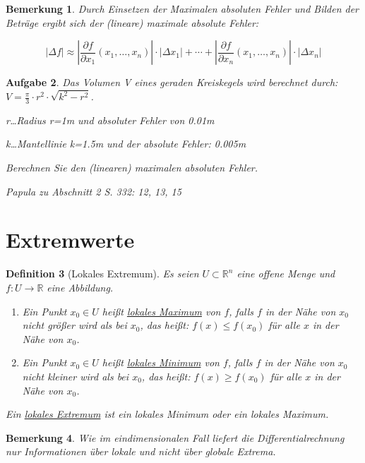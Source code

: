 \documentclass[12pt,a4paper]{scrreprt}
\newtheorem{defi}{Definition}[section]
\newtheorem{bemerkung}[defi]{Bemerkung}
\newtheorem{aufg}[defi]{Aufgabe}
\begin{document}
\begin{bemerkung}
	Durch Einsetzen der Maximalen absoluten Fehler und Bilden der Beträge ergibt sich der (lineare) maximale absolute Fehler:

	\[\left|\Delta f\right|\approx \left|\frac{\partial f}{\partial x_1}(x_1,\dots,x_n)\right|\cdot\left|\Delta x_1\right|+\cdots+\left|\frac{\partial f}{\partial x_n}(x_1,\dots,x_n)\right|\cdot\left|\Delta x_n\right|\]
\end{bemerkung}

\begin{aufg}
	Das Volumen V eines geraden Kreiskegels wird berechnet durch: $V=\frac{\pi}{3}\cdot r^2 \cdot \sqrt{k^2-r^2}$.

	r\dots Radius r=1m und absoluter Fehler von 0.01m

	k\dots Mantellinie k=1.5m und der absolute Fehler: 0.005m

	Berechnen Sie den (linearen) maximalen absoluten Fehler.

	Papula zu Abschnitt 2 S. 332: 12, 13, 15
\end{aufg}

\section{Extremwerte}

\begin{defi}[Lokales Extremum]
	Es seien $U\subset\mathbb{R}^n$ eine offene Menge und $f:U\to\mathbb{R}$ eine Abbildung.
	\begin{enumerate}[label=\emph{(\roman*)}]
		\item Ein Punkt $x_0\in U$ heißt \underline{lokales Maximum} von $f$, falls $f$ in der Nähe von $x_0$ nicht größer wird als bei $x_0$, das heißt:
		$f(x)\le f(x_0)$ für alle $x$ in der Nähe von $x_0$.
		\item Ein Punkt $x_0\in U$ heißt \underline{lokales Minimum} von $f$, falls $f$ in der Nähe von $x_0$ nicht kleiner wird als bei $x_0$, das heißt:
		$f(x)\ge f(x_0) $ für alle $x$ in der Nähe von $x_0$.
	\end{enumerate}
	Ein \underline{lokales Extremum} ist ein lokales Minimum oder ein lokales Maximum.
\end{defi}

\begin{bemerkung}
	Wie im eindimensionalen Fall liefert die Differentialrechnung nur Informationen über lokale und nicht über globale Extrema.
\end{bemerkung}
\end{document}
